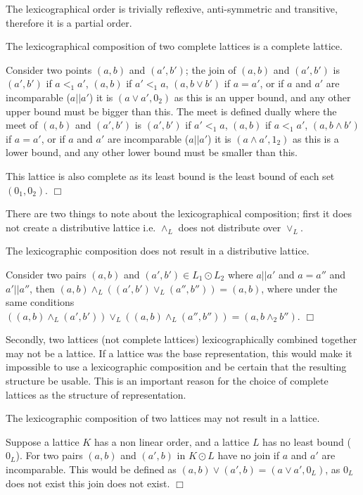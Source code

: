 The lexicographical order is trivially reflexive, anti-symmetric and transitive, therefore it is a partial order.
\begin{prop}
The lexicographical composition of two complete lattices is a complete lattice.
\end{prop}
\begin{prof}
Consider two points $(a,b)$ and $(a',b')$; 
the join of $(a,b)$ and $(a',b')$ is $(a',b')$ if $a <_1 a'$,
$(a,b)$ if $a' <_1 a$,
$(a, b \vee b')$ if $a = a'$,
or if $a$ and $a'$ are incomparable ($a||a'$) it is $(a \vee a', 0_2)$
as this is an upper bound, and any other upper bound must be bigger than this.
The meet is defined dually where the meet of $(a,b)$ and $(a',b')$ is $(a',b')$ if $a' <_1 a$,
$(a,b)$ if $a <_1 a'$,
$(a, b \wedge b')$ if $a = a'$,
or if $a$ and $a'$ are incomparable ($a||a'$) it is $(a \wedge a',1_2)$
as this is a lower bound, and any other lower bound must be smaller than this.

This lattice is also complete as its least bound is the least bound of each set $(0_1,0_2)$.
$\Box$\end{prof}

There are two things to note about the lexicographical composition; 
first it does not create a distributive lattice i.e. $\wedge_L$ does not distribute over $\vee_L$.
\begin{prop}
The lexicographic composition does not result in a distributive lattice.
\end{prop}
\begin{prof}
Consider two pairs $(a,b)$ and $(a', b') \in L_1 \odot L_2$ where $a || a'$ and $a = a''$ and $a' || a''$,
then $(a,b) \wedge_{L} ((a', b') \vee_{L} (a'', b'')) = (a,b)$,
where under the same conditions $((a,b) \wedge_{L} (a', b')) \vee_{L} ((a,b) \wedge_{L} (a'', b'')) = (a,b \wedge_2 b'')$.
$\Box$\end{prof}

Secondly, two lattices (not complete lattices) lexicographically combined together may not be a lattice. 
If a lattice was the base representation, this would make it impossible to use a lexicographic composition and be certain that the resulting structure be usable.
This is an important reason for the choice of complete lattices as the structure of representation.
\begin{prop}
The lexicographic composition of two lattices may not result in a lattice.
\end{prop}
\begin{prof}
Suppose a lattice $K$ has a non linear order, and a lattice $L$ has no least bound ($0_L$). 
For two pairs $(a,b)$ and $(a',b)$ in $K \odot L$ have no join if $a$ and $a'$ are incomparable.
This would be defined as $(a,b) \vee (a',b) = (a \vee a',0_L)$, as $0_L$ does not exist this join does not exist.
$\Box$\end{prof}

